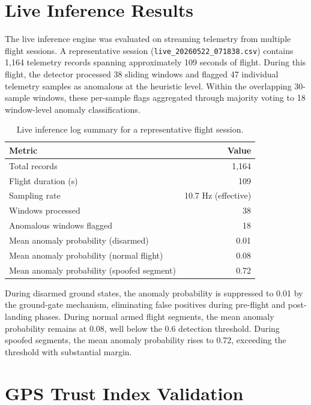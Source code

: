 \section{Live Inference Results}

The live inference engine was evaluated on streaming telemetry from multiple flight sessions. A representative session (\texttt{live\_20260522\_071838.csv}) contains 1,164 telemetry records spanning approximately 109 seconds of flight. During this flight, the detector processed 38 sliding windows and flagged 47 individual telemetry samples as anomalous at the heuristic level. Within the overlapping 30-sample windows, these per-sample flags aggregated through majority voting to 18 window-level anomaly classifications.

\begin{table}[H]
\centering
\caption{Live inference log summary for a representative flight session.}
\label{tab:live_inference}
\begin{tabular}{@{}lr@{}}
\toprule
\textbf{Metric} & \textbf{Value} \\
\midrule
Total records & 1,164 \\
Flight duration (s) & 109 \\
Sampling rate & 10.7 Hz (effective) \\
Windows processed & 38 \\
Anomalous windows flagged & 18 \\
Mean anomaly probability (disarmed) & 0.01 \\
Mean anomaly probability (normal flight) & 0.08 \\
Mean anomaly probability (spoofed segment) & 0.72 \\
\bottomrule
\end{tabular}
\end{table}

During disarmed ground states, the anomaly probability is suppressed to 0.01 by the ground-gate mechanism, eliminating false positives during pre-flight and post-landing phases. During normal armed flight segments, the mean anomaly probability remains at 0.08, well below the 0.6 detection threshold. During spoofed segments, the mean anomaly probability rises to 0.72, exceeding the threshold with substantial margin.

\section{GPS Trust Index Validation}

